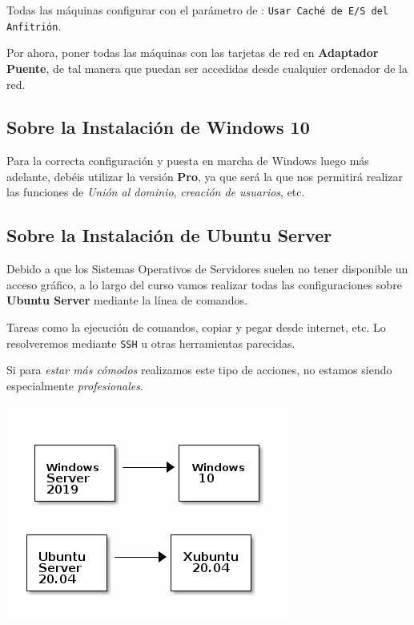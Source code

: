 \documentclass[11pt]{article}
\begin{document}
Todas las máquinas configurar con el parámetro de : \texttt{Usar Caché de E/S del Anfitrión}.

Por ahora, poner todas las máquinas con las tarjetas de red en \textbf{Adaptador Puente}, de tal 
manera que puedan ser accedidas desde cualquier ordenador de la red.

\subsection{Sobre la Instalación de Windows 10}
\label{sec:org8fd64de}

Para la correcta configuración y puesta en marcha de Windows luego más adelante, 
debéis utilizar la versión \textbf{Pro}, ya que será la que nos permitirá realizar las
funciones de \emph{Unión al dominio}, \emph{creación de usuarios}, etc.

\subsection{Sobre la Instalación de Ubuntu Server}
\label{sec:org7ef557a}

Debido a que los Sistemas Operativos de Servidores suelen no tener disponible
un acceso gráfico, a lo largo del curso vamos realizar todas las configuraciones
sobre \textbf{Ubuntu Server} mediante la línea de comandos.

Tareas como la ejecución de comandos, copiar y pegar desde internet, etc. Lo resolveremos
mediante \texttt{SSH} u otras herramientas parecidas.

Si para \emph{estar más cómodos} realizamos este tipo de acciones, no estamos siendo 
especialmente \emph{profesionales}.


\newpage


\begin{center}
\includegraphics[width=.9\linewidth]{infraetructura.png}
\end{center}
\end{document}
